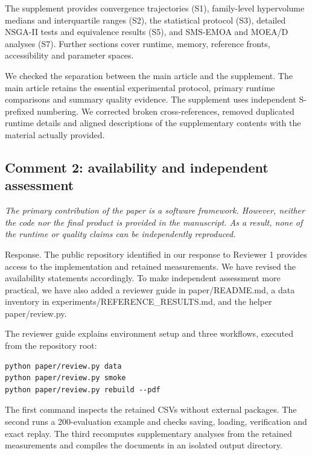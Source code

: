 \documentclass[11pt,letterpaper]{article}
\newcommand{\response}[1]{{\color{response}#1}\par}
\newcommand{\reviewercomment}[1]{{\itshape #1}\par}
\begin{document}
\response{The supplement provides convergence trajectories (S1), family-level hypervolume medians and interquartile ranges (S2), the statistical protocol (S3), detailed NSGA-II tests and equivalence results (S5), and SMS-EMOA and MOEA/D analyses (S7). Further sections cover runtime, memory, reference fronts, accessibility and parameter spaces.}

\response{We checked the separation between the main article and the supplement. The main article retains the essential experimental protocol, primary runtime comparisons and summary quality evidence. The supplement uses independent S-prefixed numbering. We corrected broken cross-references, removed duplicated runtime details and aligned descriptions of the supplementary contents with the material actually provided.}

\subsection*{Comment 2: availability and independent assessment}

\reviewercomment{The primary contribution of the paper is a software framework. However, neither the code nor the final product is provided in the manuscript. As a result, none of the runtime or quality claims can be independently reproduced.}

\response{Response. The public repository identified in our response to Reviewer 1 provides access to the implementation and retained measurements. We have revised the availability statements accordingly. To make independent assessment more practical, we have also added a reviewer guide in paper/README.md, a data inventory in experiments/REFERENCE\_RESULTS.md, and the helper paper/review.py.}

\begin{minipage}{\linewidth}
\response{The reviewer guide explains environment setup and three workflows, executed from the repository root:}
\begingroup\color{response}\small
\begin{verbatim}
python paper/review.py data
python paper/review.py smoke
python paper/review.py rebuild --pdf
\end{verbatim}
\endgroup
\end{minipage}\par

\response{The first command inspects the retained CSVs without external packages. The second runs a 200-evaluation example and checks saving, loading, verification and exact replay. The third recomputes supplementary analyses from the retained measurements and compiles the documents in an isolated output directory.}
\end{document}

